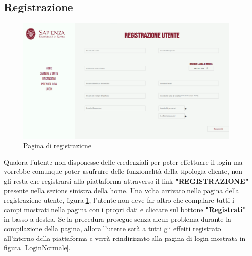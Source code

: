 \documentclass [a4paper, 12pt]{book}
\begin{document}
\subsection{Registrazione}
\begin{figure}[h]
\centering
\includegraphics[scale=0.3]{Registrazione.png}
\caption{Pagina di registrazione}
\label{Registrazione}
\end{figure}
Qualora l'utente non disponesse delle credenziali per poter effettuare il login ma vorrebbe comunque poter usufruire delle funzionalità della tipologia cliente, non gli resta che registrarsi alla piattaforma attraverso il link \textbf{"REGISTRAZIONE"} presente nella sezione sinistra della home. Una volta arrivato nella pagina della registrazione utente, figura \ref{Registrazione}, l'utente non deve far altro che compilare tutti i campi mostrati nella pagina con i propri dati e cliccare sul bottone \textbf{"Registrati"} in basso a destra. Se la procedura prosegue senza alcun problema durante la compilazione della pagina, allora l'utente sarà a tutti gli effetti registrato all'interno della piattaforma e verrà reindirizzato alla pagina di login mostrata in figura \ref{LoginNormale}.

\medskip
\medskip
\end{document}
